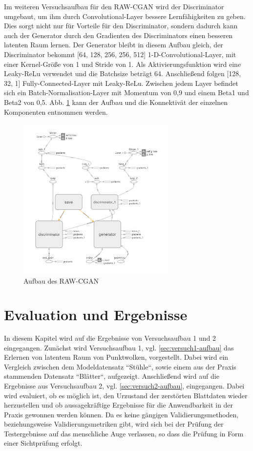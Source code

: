 \documentclass{llncs}
\begin{document}
Im weiteren Versuchsaufbau für den RAW-CGAN wird der Discriminator umgebaut, um ihm durch Convolutional-Layer bessere Lernfähigkeiten zu geben. Dies sorgt nicht nur für Vorteile für den Discriminator, sondern dadurch kann auch der Generator durch den Gradienten des Discriminators einen besseren latenten Raum lernen. Der Generator bleibt in diesem Aufbau gleich, der Discriminator bekommt [64, 128, 256, 256, 512] 1-D-Convolutional-Layer, mit einer Kernel-Größe von 1 und Stride von 1. Als Aktivierungsfunktion wird eine Leaky-ReLu verwendet und die Batchsize beträgt 64. Anschließend folgen [128, 32, 1] Fully-Connected-Layer mit Leaky-ReLu. Zwischen jedem Layer befindet sich ein Batch-Normalisation-Layer mit Momentum von 0,9 und einem Beta1 und Beta2 von 0,5. Abb. \ref{fig:Bild55} kann der Aufbau und die Konnektivät der einzelnen Komponenten entnommen werden.

\begin{figure}[htbp] 
	\centering
	\includegraphics[width=0.7\textwidth]{point-cgan.png}
	\caption{Aufbau des RAW-CGAN}
	\label{fig:Bild55}
\end{figure}
\newpage

\section{Evaluation und Ergebnisse}

In diesem Kapitel wird auf die Ergebnisse von Versuchsaufbau 1 und 2 eingegangen. Zunächst wird Versuchsaufbau 1, vgl. \ref{sec:versuch1-aufbau} das Erlernen von latentem Raum von Punktwolken, vorgestellt. Dabei wird ein Vergleich zwischen dem Modeldatensatz ``Stühle``, sowie einem aus der Praxis stammenden Datensatz ``Blätter``, aufgezeigt. Anschließend wird auf die Ergebnisse aus Versuchsaufbau 2, vgl. \ref{sec:versuch2-aufbau}, eingegangen. Dabei wird evaluiert, ob es möglich ist, den Urzustand der zerstörten Blattdaten wieder herzustellen und ob aussagekräftige Ergebnisse für die Anwendbarkeit in der Praxis gewonnen werden können. Da es keine gängigen Validierungsmethoden, beziehungsweise Validierungsmetriken gibt, wird sich bei der Prüfung der Testergebnisse auf das menschliche Auge verlassen, so dass die Prüfung in Form einer Sichtprüfung erfolgt.
\end{document}
